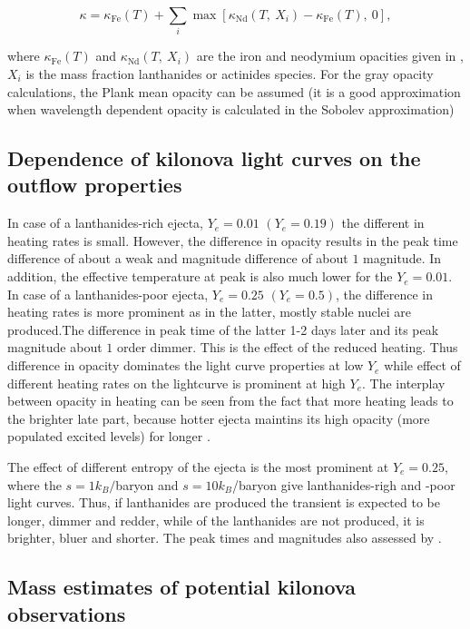\begin{equation}
\kappa = \kappa_{\text{Fe}}(T) + \sum_i \max[\kappa_{\text{Nd}}(T,\: X_i) - \kappa_{\text{Fe}}(T),\: 0],
\end{equation}

where $\kappa_{\text{Fe}}(T)$ and $\kappa_{\text{Nd}}(T,\: X_i)$ are the iron and neodymium opacities given in \cite{Kasen:2013xka}, $X_i$ is the mass fraction lanthanides or actinides species. 
For the gray opacity calculations, the Plank mean opacity can be assumed (it is a good approximation when wavelength dependent opacity is calculated in the Sobolev approximation)


\subsection{Dependence of kilonova light curves on the outflow properties}


In case of a lanthanides-rich ejecta, $Y_e=0.01$ $(Y_e=0.19)$ the different in heating rates is small. However, the difference in opacity results in the peak time difference of about a weak and magnitude difference of about $1$ magnitude. In addition, the effective temperature at peak is also much lower for the $Y_e=0.01$. 
In case of a lanthanides-poor ejecta, $Y_e=0.25$ $(Y_e=0.5)$, the difference in heating rates is more prominent as in the latter, mostly stable nuclei are produced.The difference in peak time of the latter 1-2 days later and its peak magnitude about $1$ order dimmer. This is the effect of the reduced heating.
Thus difference in opacity dominates the light curve properties at low $Y_e$ while effect of different heating rates on the lightcurve is prominent at high $Y_e$. 
The interplay between opacity in heating can be seen from the fact that more heating leads to the brighter late part, because hotter ejecta maintins its high opacity (more populated excited levels) for longer \citep{Kasen:2013xka}. 

The effect of different entropy of the ejecta is the most prominent at $Y_e=0.25$, where the $s=1k_B/$baryon and $s=10k_B$/baryon give lanthanides-righ and -poor light curves.
Thus, if lanthanides are produced the transient is expected to be longer, dimmer and redder, while of the lanthanides are not produced, it is brighter, bluer and shorter.
The peak times and magnitudes also assessed by \citet{Roberts:2011,Barnes:2013wka,Tanaka:2013ana}. 


\subsection{Mass estimates of potential kilonova observations}


